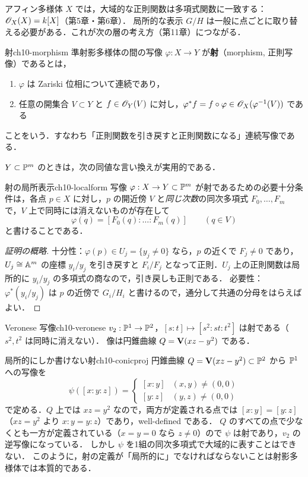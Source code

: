 アフィン多様体 $X$ では，大域的な正則関数は多項式関数に一致する：$\mathscr{O}_X(X)=k[X]$（第5章・第6章）．
局所的な表示 $G/H$ は一般に点ごとに取り替える必要がある．これが次の層の考え方（第11章）につながる．

\begin{mydef}{射}{ch10-morphism}
準射影多様体の間の写像 $\varphi:X\to Y$ が\textbf{射}（morphism, 正則写像）であるとは，
\begin{enumerate}
  \item $\varphi$ は Zariski 位相について連続であり，
  \item 任意の開集合 $V\subset Y$ と $f\in\mathscr{O}_Y(V)$ に対し，$\varphi^*f=f\circ\varphi\in\mathscr{O}_X(\varphi^{-1}(V))$ である
\end{enumerate}
ことをいう．すなわち「正則関数を引き戻すと正則関数になる」連続写像である．
\end{mydef}

$Y\subset\mathbb{P}^m$ のときは，次の同値な言い換えが実用的である．

\begin{myprop}{射の局所表示}{ch10-localform}
写像 $\varphi:X\to Y\subset\mathbb{P}^m$ が射であるための必要十分条件は，各点 $p\in X$ に対し，$p$ の開近傍 $V$ と\emph{同じ次数}の同次多項式 $F_0,\dots,F_m$ で，$V$ 上で同時には消えないものが存在して
\[
  \varphi(q)=[F_0(q):\dots:F_m(q)]\qquad(q\in V)
\]
と書けることである．
\end{myprop}

\begin{proof}[証明の概略]
十分性：$\varphi(p)\in U_j=\{y_j\neq0\}$ なら，$p$ の近くで $F_j\neq0$ であり，$U_j\cong\mathbb{A}^m$ の座標 $y_i/y_j$ を引き戻すと $F_i/F_j$ となって正則．$U_j$ 上の正則関数は局所的に $y_i/y_j$ の多項式の商なので，引き戻しも正則である．
必要性：$\varphi^*(y_i/y_j)$ は $p$ の近傍で $G_i/H_i$ と書けるので，通分して共通の分母をはらえばよい．
\end{proof}

\begin{myex}{Veronese 写像}{ch10-veronese}
$v_2:\mathbb{P}^1\to\mathbb{P}^2$，$[s:t]\mapsto[s^2:st:t^2]$ は射である（$s^2,t^2$ は同時に消えない）．
像は円錐曲線 $Q=\mathbf{V}(xz-y^2)$ である．
\end{myex}

\begin{myex}{局所的にしか書けない射}{ch10-conicproj}
円錐曲線 $Q=\mathbf{V}(xz-y^2)\subset\mathbb{P}^2$ から $\mathbb{P}^1$ への写像を
\[
  \psi([x:y:z])=\begin{cases}[x:y] & (x,y)\neq(0,0)\\ [y:z] & (y,z)\neq(0,0)\end{cases}
\]
で定める．$Q$ 上では $xz=y^2$ なので，両方が定義される点では $[x:y]=[y:z]$（$xz=y^2$ より $x:y=y:z$）であり，well-defined である．
$Q$ のすべての点で少なくとも一方が定義されている（$x=y=0$ なら $z\neq0$）ので $\psi$ は射であり，$v_2$ の逆写像になっている．
しかし $\psi$ を1組の同次多項式で大域的に表すことはできない．
このように，射の定義が「局所的に」でなければならないことは射影多様体では本質的である．
\end{myex}

